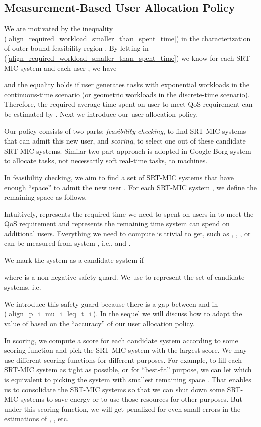\documentclass[prodmode,acmtompecs]{acmsmall}
\begin{document}
\subsection{Measurement-Based User Allocation Policy}
We are motivated by the inequality (\ref{align_required_workload_smaller_than_spent_time}) in the characterization of outer bound feasibility region . By letting  in (\ref{align_required_workload_smaller_than_spent_time}) we know for each SRT-MIC system  and each user , we have

and the equality holds if user  generates tasks with exponential workloads in the continuous-time scenario (or geometric workloads in the discrete-time scenario). 
Therefore, the required average time spent on user  to meet QoS requirement  can be estimated by . Next we introduce our user allocation policy. 

Our policy consists of two parts: {\em feasibility checking}, to find SRT-MIC systems that can admit this new user, and {\em scoring}, to select one out of these candidate SRT-MIC systems. Similar two-part approach is adopted in Google Borg system \cite{VPK15A} to allocate tasks, not necessarily soft real-time tasks, to machines. 

In feasibility checking, we aim to find a set of SRT-MIC systems that have enough ``space'' to admit the new user . For each SRT-MIC system , we define the remaining space  as follows, 

Intuitively,  represents the required time we need to spent on users in  to meet the QoS requirement  and  represents the remaining time system  can spend on additional users. Everything we need to compute  is trivial to get, such as , , , or can be measured from system , i.e.,  and . 

We mark the system  as a candidate system if 

where  is a non-negative safety guard. We use  to represent the set of candidate systems, i.e. 

We introduce this safety guard  because there is a gap between  and  in (\ref{align_p_i_mu_i_leq_t_i}). In the sequel we will discuss how to adapt the value of  based on the ``accuracy'' of our user allocation policy. 

In scoring, we compute a score for each candidate system  according to some scoring function  and pick the SRT-MIC system with the largest score. We may use different scoring functions for different purposes. For example, to fill each SRT-MIC system as tight as possible, or for ``best-fit'' purpose, we can let  which is equivalent to picking the system  with smallest remaining space . That enables us to consolidate the SRT-MIC systems so that we can shut down some SRT-MIC systems to save energy or to use those resources for other purposes. But under this scoring function, we will get penalized for even small errors in the estimations of , , etc. 
\end{document}
